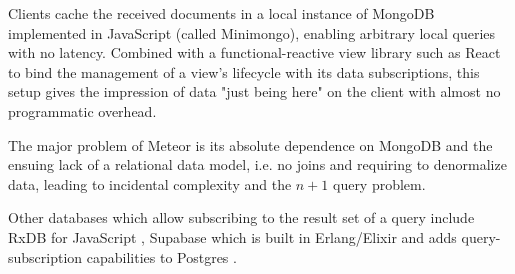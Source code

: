 Clients cache the received documents in a local instance of MongoDB implemented in JavaScript (called Minimongo), enabling arbitrary local queries with no latency. Combined with a functional-reactive view library such as React to bind the management of a view's lifecycle with its data subscriptions, this setup gives the impression of data "just being here" on the client with almost no programmatic overhead.

The major problem of Meteor is its absolute dependence on MongoDB and the ensuing lack of a relational data model, i.e. no joins and requiring to denormalize data, leading to incidental complexity and the $n+1$ query problem.

Other databases which allow subscribing to the result set of a query include RxDB for JavaScript \cite{wingerath2019real}, Supabase which is built in Erlang/Elixir and adds query-subscription capabilities to Postgres \cite{supabase}.

